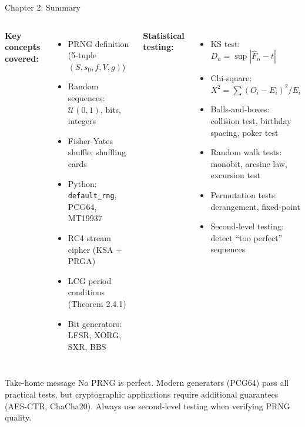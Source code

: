 \documentclass[aspectratio=169,10pt]{beamer}
\begin{document}
\begin{frame}{Chapter 2: Summary}

\begin{columns}
\textbf{Key concepts covered:}
\begin{itemize}
  \item PRNG definition (5-tuple $(S,s_0,f,V,g)$)
  \item Random sequences: $\mathcal{U}(0,1)$, bits, integers
  \item Fisher-Yates shuffle; shuffling cards
  \item Python: \texttt{default\_rng}, PCG64, MT19937
  \item RC4 stream cipher (KSA + PRGA)
  \item LCG period conditions (Theorem 2.4.1)
  \item Bit generators: LFSR, XORG, SXR, BBS
\end{itemize}

\textbf{Statistical testing:}
\begin{itemize}
  \item KS test: $D_n = \sup|\hat{F}_n - t|$
  \item Chi-square: $X^2 = \sum(O_i-E_i)^2/E_i$
  \item Balls-and-boxes: collision test, birthday spacing, poker test
  \item Random walk tests: monobit, arcsine law, excursion test
  \item Permutation tests: derangement, fixed-point
  \item Second-level testing: detect ``too perfect'' sequences
\end{itemize}
\end{columns}

\medskip
\begin{alertblock}{Take-home message}
No PRNG is perfect. Modern generators (PCG64) pass all practical tests,
but cryptographic applications require additional guarantees (AES-CTR, ChaCha20).
Always use second-level testing when verifying PRNG quality.
\end{alertblock}

\end{frame}
\end{document}
